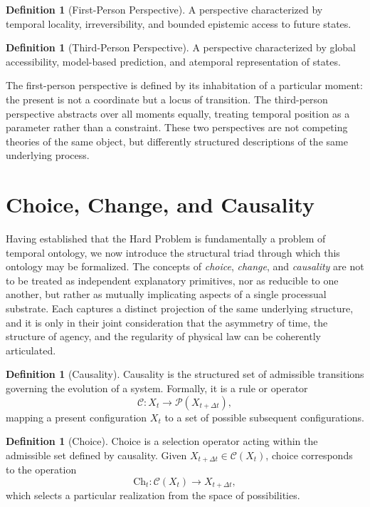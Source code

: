 \documentclass[11pt,a4paper]{article}
\theoremstyle{definition}
\newtheorem{definition}[theorem]{Definition}
\theoremstyle{remark}
\begin{document}
\begin{definition}[First-Person Perspective]
A perspective characterized by temporal locality, irreversibility, and bounded epistemic access to future states.
\end{definition}

\begin{definition}[Third-Person Perspective]
A perspective characterized by global accessibility, model-based prediction, and atemporal representation of states.
\end{definition}

The first-person perspective is defined by its inhabitation of a particular moment: the present is not a coordinate but a locus of transition. The third-person perspective abstracts over all moments equally, treating temporal position as a parameter rather than a constraint. These two perspectives are not competing theories of the same object, but differently structured descriptions of the same underlying process.

\section{Choice, Change, and Causality}

Having established that the Hard Problem is fundamentally a problem of temporal ontology, we now introduce the structural triad through which this ontology may be formalized. The concepts of \emph{choice}, \emph{change}, and \emph{causality} are not to be treated as independent explanatory primitives, nor as reducible to one another, but rather as mutually implicating aspects of a single processual substrate. Each captures a distinct projection of the same underlying structure, and it is only in their joint consideration that the asymmetry of time, the structure of agency, and the regularity of physical law can be coherently articulated.

\begin{definition}[Causality]
Causality is the structured set of admissible transitions governing the evolution of a system. Formally, it is a rule or operator
\[
\mathcal{C} : X_t \rightarrow \mathcal{P}(X_{t+\Delta t}),
\]
mapping a present configuration $X_t$ to a set of possible subsequent configurations.
\end{definition}

\begin{definition}[Choice]
Choice is a selection operator acting within the admissible set defined by causality. Given $X_{t+\Delta t} \in \mathcal{C}(X_t)$, choice corresponds to the operation
\[
\mathrm{Ch}_t : \mathcal{C}(X_t) \rightarrow X_{t+\Delta t},
\]
which selects a particular realization from the space of possibilities.
\end{definition}
\end{document}
